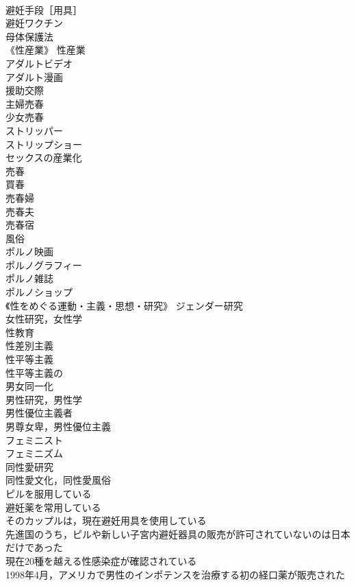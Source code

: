 \documentclass[8pt]{extreport}
\begin{document}
\begin{CJK}{UTF8}{min}
\\	避妊手段［用具］ 
\\	避妊ワクチン 
\\	母体保護法 
\\	《性産業》 性産業 
\\	アダルトビデオ 
\\	アダルト漫画 
\\	援助交際 
\\	主婦売春 
\\	少女売春 
\\	ストリッパー 
\\	ストリップショー 
\\	セックスの産業化 
\\	売春 
\\	買春 
\\	売春婦 
\\	売春夫 
\\	売春宿 
\\	風俗 
\\	ポルノ映画 
\\	ポルノグラフィー 
\\	ポルノ雑誌 
\\	ポルノショップ 
\\	《性をめぐる運動・主義・思想・研究》 ジェンダー研究 
\\	女性研究，女性学 
\\	性教育 
\\	性差別主義 
\\	性平等主義 
\\	性平等主義の 
\\	男女同一化 
\\	男性研究，男性学 
\\	男性優位主義者 
\\	男尊女卑，男性優位主義 
\\	フェミニスト 
\\	フェミニズム 
\\	同性愛研究 
\\	同性愛文化，同性愛風俗 
\\	ピルを服用している 
\\	避妊薬を常用している 
\\	そのカップルは，現在避妊用具を使用している 
\\	先進国のうち，ピルや新しい子宮内避妊器具の販売が許可されていないのは日本だけであった 
\\	現在20種を越える性感染症が確認されている 
\\	1998年4月，アメリカで男性のインポテンスを治療する初の経口薬が販売された 

\end{CJK}
\end{document}
